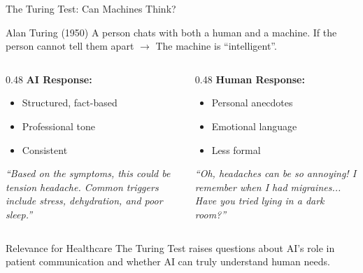 \documentclass[aspectratio=169, 10pt]{beamer}
\begin{document}
\begin{frame}{The Turing Test: Can Machines Think?}

    \begin{block}{\footnotesize Alan Turing (1950)}
        \footnotesize
        A person chats with both a human and a machine. If the person cannot tell them apart $\rightarrow$ The machine is ``intelligent''.
    \end{block}

    \vspace{3mm}
    \begin{columns}
        \begin{column}{0.48\textwidth}
            \textbf{AI Response:}
            \begin{itemize}
                \item Structured, fact-based
                \item Professional tone
                \item Consistent
            \end{itemize}
            \textit{``Based on the symptoms, this could be tension headache. Common triggers include stress, dehydration, and poor sleep.''}
        \end{column}

        \begin{column}{0.48\textwidth}
            \textbf{Human Response:}
            \begin{itemize}
                \item Personal anecdotes
                \item Emotional language
                \item Less formal
            \end{itemize}
            \textit{``Oh, headaches can be so annoying! I remember when I had migraines... Have you tried lying in a dark room?''}
        \end{column}
    \end{columns}

    \vspace{3mm}
    \begin{alertblock}{\footnotesize Relevance for Healthcare}
        \footnotesize
        The Turing Test raises questions about AI's role in patient communication and whether AI can truly understand human needs.
    \end{alertblock}

\end{frame}
\end{document}
